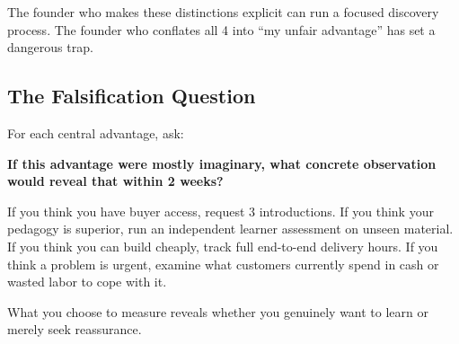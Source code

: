 The founder who makes these distinctions explicit can run a focused discovery process. The founder who conflates all 4 into ``my unfair advantage'' has set a dangerous trap.

\subsection{The Falsification Question}

For each central advantage, ask:

\begin{tcolorbox}[
  enhanced,
  colback=BayesPale!25!white,
  colframe=BayesBorder!60!white,
  boxrule=0.4pt,
  arc=2pt,
  left=6pt,right=6pt,top=4pt,bottom=4pt,
  before skip=3pt,after skip=4pt
]
\footnotesize\color{BayesInk}
\textbf{If this advantage were mostly imaginary, what concrete observation would reveal that within 2 weeks?}
\end{tcolorbox}

If you think you have buyer access, request 3 introductions. If you think your pedagogy is superior, run an independent learner assessment on unseen material. If you think you can build cheaply, track full end-to-end delivery hours. If you think a problem is urgent, examine what customers currently spend in cash or wasted labor to cope with it.

What you choose to measure reveals whether you genuinely want to learn or merely seek reassurance.
